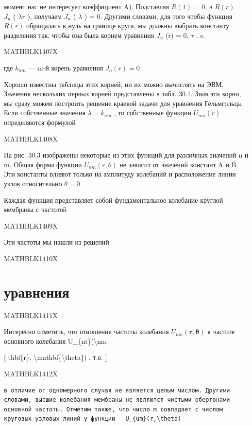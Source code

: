 \documentclass[
]{article}
\begin{document}
момент нас не интересует коэффициент A). Подставляя \(R (1)\) = 0, в
\(R (r)\) = \(J_n\) ( \(\lambda r\) ), получаем \(J_n\) ( \(\lambda\) )
= 0. Другими словами, для того чтобы функция \(R (r)\) обращалась в нуль
на границе круга, мы должны выбрать константу разделения так, чтобы она
была корнем уравнения \(J_n\) (r) = 0, \(\tau\) . e.

MATHBLK1407X

где \(k_{nm}\) --- m-й корень уравнения \(J_n(r) = 0\) .

Хорошо известны таблицы этих корней, но их можно вычислять на ЭВМ.
Значения нескольких первых корней представлены в табл. 30.1. Зная эти
корни, мы сразу можем построить решение краевой задачи для уравнения
Гельмгольца. Если собственные значения \(\lambda = k_{nm}\) , то
собственные функции \(U_{ nm}(r)\) определяются формулой

MATHBLK1408X

На рис. 30.3 изображены некоторые из этих функций для различных значений
n и m. Общая форма функции \(U_{nm}(r,\theta)\) не зависит от значений
констант A и B. Эти константы влияют только на амплитуду колебаний и
расположение линии узлов относительно \(\theta=0\) .

Каждая функция представляет собой фундаментальное колебание круглой
мембраны с частотой

MATHBLK1409X

Эти частоты мы нашли из решений

MATHBLK1410X

\section{уравнения}\label{ux443ux440ux430ux432ux43dux435ux43dux438ux44f}

MATHBLK1411X

Интересно отметить, что отношение частоты колебания
\(U_{nm}(\mathbf{r}, \mathbf{\theta})\) к частоте основного колебания
U\_\{nt\}(\textbackslash ma

{[} thbf\{r\}, \textbackslash mathbf\{\textbackslash theta\}) , т.е. {]}

MATHBLK1412X

\begin{verbatim}
в отличие от одномерного случая не является целым числом. Другими словами, высшие колебания мембраны не являются чистыми обертонами основной частоты. Отметим также, что число m совпадает с числом круговых узловых линий у функции   U_{um}(r,\theta)
\end{verbatim}
\end{document}
